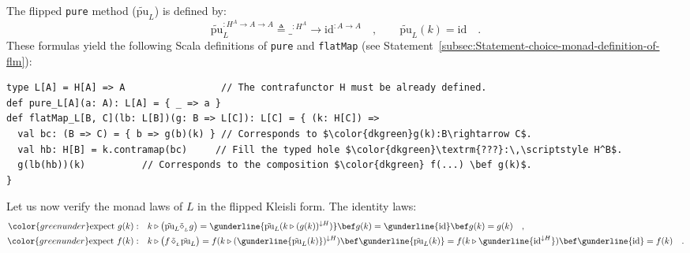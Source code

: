 The flipped \lstinline!pure! method ($\tilde{\text{pu}}_{L}$) is
defined by:
\begin{equation}
\tilde{\text{pu}}_{L}^{:H^{A}\rightarrow A\rightarrow A}\triangleq\_^{:H^{A}}\rightarrow\text{id}^{:A\rightarrow A}\quad,\quad\quad\tilde{\text{pu}}_{L}(k)=\text{id}\quad.\label{eq:def-of-pure-for-exp-construction-h-a-a}
\end{equation}
These formulas yield the following Scala definitions of \lstinline!pure!
and \lstinline!flatMap! (see Statement~\ref{subsec:Statement-choice-monad-definition-of-flm}):
\begin{lstlisting}[mathescape=true]
type L[A] = H[A] => A                 // The contrafunctor H must be already defined.
def pure_L[A](a: A): L[A] = { _ => a }
def flatMap_L[B, C](lb: L[B])(g: B => L[C]): L[C] = { (k: H[C]) =>
  val bc: (B => C) = { b => g(b)(k) } // Corresponds to $\color{dkgreen}g(k):B\rightarrow C$.
  val hb: H[B] = k.contramap(bc)     // Fill the typed hole $\color{dkgreen}\textrm{???}:\,\scriptstyle H^B$.
  g(lb(hb))(k)          // Corresponds to the composition $\color{dkgreen} f(...) \bef g(k)$.
}
\end{lstlisting}

Let us now verify the monad laws of $L$ in the flipped Kleisli form.
The identity laws:
\begin{align*}
{\color{greenunder}\text{expect }g(k):}\quad & k\triangleright\big(\tilde{\text{pu}}_{L}\tilde{\diamond}_{_{L}}g\big)=\gunderline{\tilde{\text{pu}}_{L}(k\triangleright(g(k))^{\downarrow H})}\bef g(k)=\gunderline{\text{id}}\bef g(k)=g(k)\quad,\\
{\color{greenunder}\text{expect }f(k):}\quad & k\triangleright\big(f\,\tilde{\diamond}_{_{L}}\tilde{\text{pu}}_{L}\big)=f(k\triangleright(\gunderline{\tilde{\text{pu}}_{L}(k)})^{\downarrow H})\bef\gunderline{\tilde{\text{pu}}_{L}(k)}=f(k\triangleright\gunderline{\text{id}^{\downarrow H}})\bef\gunderline{\text{id}}=f(k)\quad.
\end{align*}

